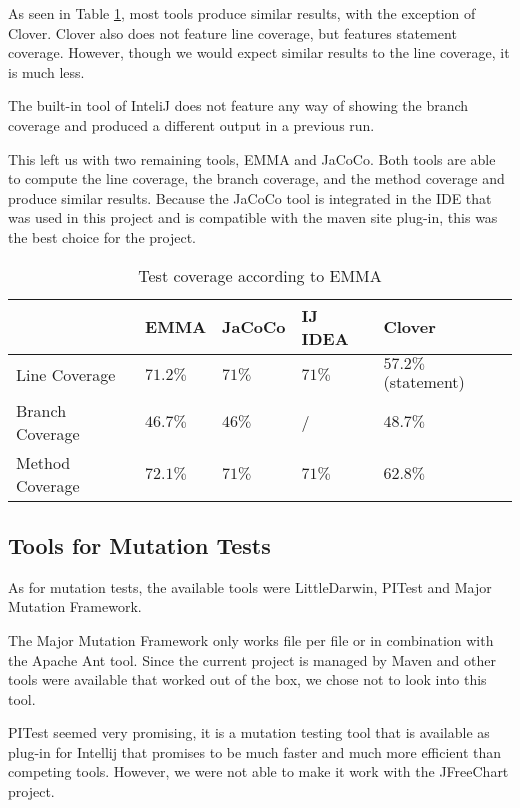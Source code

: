 \documentclass[]{article}
\begin{document}
As seen in Table \ref{testCoverageTools}, most tools produce similar results, with the exception of Clover. Clover also does not feature line coverage, but features statement coverage. However, though we would expect similar results to the line coverage, it is much less.

The built-in tool of InteliJ does not feature any way of showing the branch coverage and produced a different output in a previous run. 

This left us with two remaining tools, EMMA and JaCoCo. Both tools are able to compute the line coverage, the branch coverage, and the method coverage and produce similar results. Because the JaCoCo tool is integrated in the IDE that was used in this project and is compatible with the maven site plug-in, this was the best choice for the project. 

\begin{table}[]
	\begin{center}
		\begin{tabular}{|l||l|l|l|l|}
			\hline
			&  EMMA & JaCoCo & IJ IDEA & Clover\\ \hline\hline
			Line Coverage	& $71.2\%$ & $71\%$ & $71\%$ &  $57.2\%$ (statement)\\
			Branch Coverage	& $46.7\%$ & $46\%$ &  / & $48.7\%$\\
			Method Coverage	& $72.1\%$ & $71\%$ & $71\%$& $62.8\%$ \\ 
			\hline
		\end{tabular}
		\caption{Test coverage according to EMMA}
		\label{testCoverageTools}
	\end{center}
	
\end{table}

\subsection{Tools for Mutation Tests}

As for mutation tests, the available tools were LittleDarwin, PITest and Major Mutation Framework. 

The Major Mutation Framework only works file per file or in combination with the Apache Ant tool. Since the current project is managed by Maven and other tools were available that worked out of the box, we chose not to look into this tool. 

PITest seemed very promising, it is a mutation testing tool that is available as plug-in for Intellij that promises to be much faster and much more efficient than competing tools. However, we were not able to make it work with the JFreeChart project. 
\end{document}

